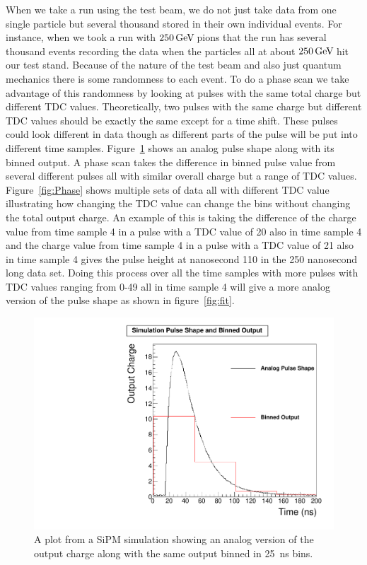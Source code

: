 When we take a run using the test beam, we do not just take data from one single particle but several thousand stored in their own individual events. For instance, when we took a run with $250{\,\text{Ge\hspace{-.08em}V\hspace{-0.16em}}}$ pions that the run has several thousand events recording the data when the particles all at about $250{\,\text{Ge\hspace{-.08em}V\hspace{-0.16em}}}$ hit our test stand. Because of the nature of the test beam and also just quantum mechanics there is some randomness to each event. To do a phase scan we take advantage of this randomness by looking at pulses with the same total charge but different TDC values. Theoretically, two pulses with the same charge but different TDC values should be exactly the same except for a time shift. These pulses could look different in data though as different parts of the pulse will be put into different time samples. Figure~\ref{fig:bin} shows an analog pulse shape along with its binned output. A phase scan takes the difference in binned pulse value from several different pulses all with similar overall charge but a range of TDC values. Figure~\ref{fig:Phase} shows multiple sets of data all with different TDC value illustrating how changing the TDC value can change the bins without changing the total output charge. An example of this is taking the difference of the charge value from time sample 4 in a pulse with a TDC value of 20 also in time sample 4 and the charge value from time sample 4 in a pulse with a TDC value of 21 also in time sample 4 gives the pulse height at nanosecond 110 in the 250 nanosecond long data set. Doing this process over all the time samples with more pulses with TDC values ranging from 0-49 all in time sample 4 will give a more analog version of the pulse shape as shown in figure~\ref{fig:fit}.

\begin{figure}
\centering
\includegraphics[width=0.6\linewidth]{Figures/Bin.pdf}
\caption{A plot from a SiPM simulation showing an analog version of the output charge along with the same output binned in 25~ns bins.}
\label{fig:bin}
\end{figure}

